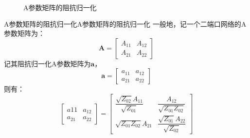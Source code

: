 \begin{figure}[h!]
\begin{center}
        \end{center}
        \caption{\kaishu A参数矩阵的阻抗归一化}\label{Fig: A参数矩阵的阻抗归一化}
    \end{figure}

    \begin{theorem}{A参数矩阵的阻抗归一化}{A参数矩阵的阻抗归一化}
        一般地，记一个二端口网络的A参数矩阵为：
        \begin{equation*}
            \bm{A}=\begin{bmatrix}
                A_{11}&A_{12}\\
                A_{21}&A_{22}
            \end{bmatrix}
        \end{equation*}
        记其阻抗归一化A参数矩阵为$\bm{a}$，
        \begin{equation*}
            \bm{a}=\begin{bmatrix}
                a_{11}&a_{12}\\
                a_{21}&a_{22}
            \end{bmatrix}
        \end{equation*}
        则有：
        \begin{equation}
            \begin{bmatrix}
                a{11}&a_{12}\\
                a_{21}&a_{22}
            \end{bmatrix}    
            =\begin{bmatrix}
                \dfrac{\sqrt{Z_{02}}A_{11}}{\sqrt{Z_{01}}} & \dfrac{A_{12}}{\sqrt{Z_{01}Z_{02}}}\\
                \sqrt{Z_{01}Z_{02}}A_{21} & \dfrac{\sqrt{Z_{01}}A_{22}}{\sqrt{Z_{02}}}
            \end{bmatrix}
        \end{equation}
    \end{theorem}

